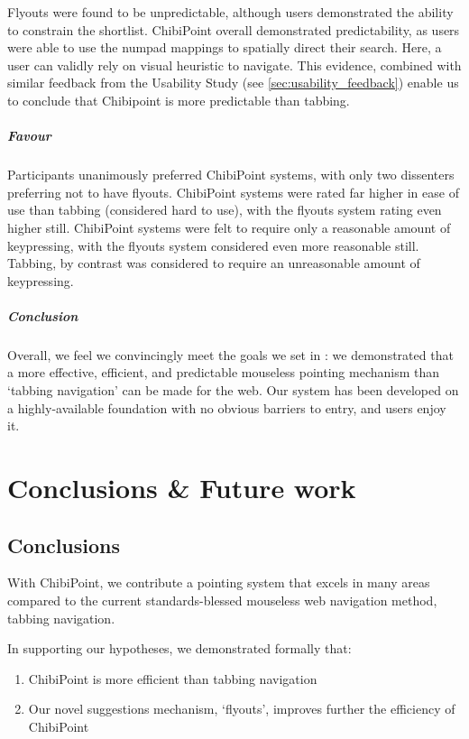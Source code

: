 \documentclass[11pt,openright,a4paper]{report}
\begin{document}
Flyouts were found to be unpredictable, although users demonstrated the ability to constrain the shortlist. ChibiPoint overall demonstrated predictability, as users were able to use the numpad mappings to spatially direct their search. Here, a user can validly rely on visual heuristic to navigate. This evidence, combined with similar feedback from the Usability Study (see \cref{sec:usability_feedback}) enable us to conclude that Chibipoint is more predictable than tabbing.

\paragraph{Favour}
Participants unanimously preferred ChibiPoint systems, with only two dissenters preferring not to have flyouts. ChibiPoint systems were rated far higher in ease of use than tabbing (considered hard to use), with the flyouts system rating even higher still. ChibiPoint systems were felt to require only a reasonable amount of keypressing, with the flyouts system considered even more reasonable still. Tabbing, by contrast was considered to require an unreasonable amount of keypressing.

\paragraph{Conclusion}
Overall, we feel we convincingly meet the goals we set in : we demonstrated that a more effective, efficient, and predictable mouseless pointing mechanism than `tabbing navigation' can be made for the web. Our system has been developed on a highly-available foundation with no obvious barriers to entry, and users enjoy it.

\chapter{Conclusions \& Future work}
\label{chap:conclusions}
\section{Conclusions}
With ChibiPoint, we contribute a pointing system that excels in many areas compared to the current standards-blessed mouseless web navigation method, tabbing navigation.

In supporting our hypotheses, we demonstrated formally that:
\begin{enumerate}
	\item ChibiPoint is more efficient than tabbing navigation
	\item Our novel suggestions mechanism, `flyouts', improves further the efficiency of ChibiPoint
\end{enumerate}
\end{document}
